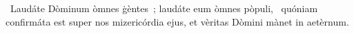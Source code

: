 \psalmChapterWithInscription{}
{ }
{%
~Laudáte Dòminum òmnes ġèntes~; laudáte eum òmnes pòpuli, 
~quóniam confirmáta est super nos mizericórdia ejus, et vèritas Dòmini mànet in aetèrnum. 
}
